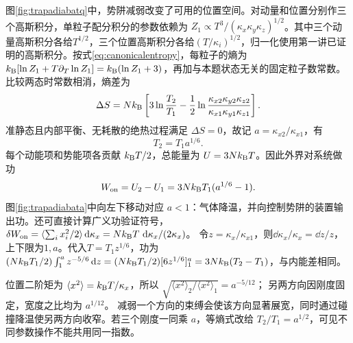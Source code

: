 \begin{solution}
图\ref{fig:trapadiabatq}中，势阱减弱改变了可用的位置空间。对动量和位置分别作三个高斯积分，单粒子配分积分的参数依赖为
$Z_1\propto T^3/(\kappa_x\kappa_y\kappa_z)^{1/2}$。其中三个动量高斯积分各给$T^{1/2}$，三个位置高斯积分各给$(T/\kappa_i)^{1/2}$，归一化使用第一讲已证明的高斯积分。按式\eqref{eq:canonicalentropy}，每粒子的熵为$k_{\mathrm B}[\ln Z_1+T\partial_T\ln Z_1]=k_{\mathrm B}(\ln Z_1+3)$，再加与本题状态无关的固定粒子数常数。比较两态时常数相消，熵差为
\[
 \Delta S=Nk_{\mathrm B}\left[
 3\ln\frac{T_2}{T_1}
 -\frac12\ln\frac{\kappa_{x2}\kappa_{y2}\kappa_{z2}}
 {\kappa_{x1}\kappa_{y1}\kappa_{z1}}\right].
\]
准静态且内部平衡、无耗散的绝热过程满足 $\Delta S=0$，故记 $a=\kappa_{x2}/\kappa_{x1}$，有
\[
 T_2=T_1a^{1/6}.
\]
每个动能项和势能项各贡献 $k_{\mathrm B} T/2$，总能量为 $U=3Nk_{\mathrm B} T$。因此外界对系统做功
\[
 W_{\rm on}=U_2-U_1=3Nk_{\mathrm B} T_1(a^{1/6}-1).
\]
图\ref{fig:trapadiabata}中向左下移动对应 $a<1$：气体降温，并向控制势阱的装置输出功。还可直接计算广义功验证符号，
$\delta W_{\rm on}=\langle\sum_i x_i^2/2\rangle\mathop{}\!\mathrm d\kappa_x
 =Nk_{\mathrm B} T\,\mathop{}\!\mathrm d\kappa_x/(2\kappa_x)$。
令$z=\kappa_x/\kappa_{x1}$，则$\dd\kappa_x/\kappa_x=\dd z/z$，上下限为$1,a$。代入$T=T_1z^{1/6}$，功为$(Nk_{\mathrm B} T_1/2)\int_1^a z^{-5/6}\mathop{}\!\mathrm d z=(Nk_{\mathrm B} T_1/2)[6z^{1/6}]_1^a=3Nk_{\mathrm B}(T_2-T_1)$，与内能差相同。

位置二阶矩为 $\langle x^2\rangle=k_{\mathrm B} T/\kappa_x$，所以
$\sqrt{\langle x^2\rangle_2/\langle x^2\rangle_1}=a^{-5/12}$；
另两方向因刚度固定，宽度之比均为 $a^{1/12}$。
减弱一个方向的束缚会使该方向显著展宽，同时通过碰撞降温使另两方向收窄。若三个刚度一同乘 $a$，等熵式改给 $T_2/T_1=a^{1/2}$，可见不同参数操作不能共用同一指数。
\end{solution}

